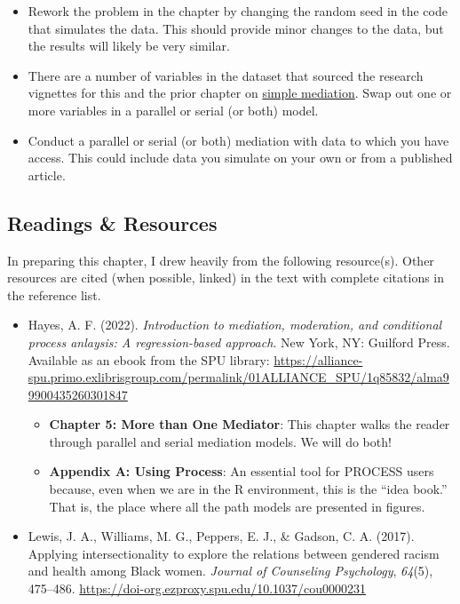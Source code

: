 \documentclass[
  11pt,
]{book}
\providecommand{\tightlist}{%
  \setlength{\itemsep}{0pt}\setlength{\parskip}{0pt}}
\begin{document}
\begin{itemize}
\tightlist
\item
  Rework the problem in the chapter by changing the random seed in the code that simulates the data. This should provide minor changes to the data, but the results will likely be very similar.
\item
  There are a number of variables in the dataset that sourced the research vignettes for this and the prior chapter on \protect\hyperlink{SimpleMed}{simple mediation}. Swap out one or more variables in a parallel or serial (or both) model.
\item
  Conduct a parallel or serial (or both) mediation with data to which you have access. This could include data you simulate on your own or from a published article.
\end{itemize}

\hypertarget{readings-resources-5}{%
\subsection{Readings \& Resources}\label{readings-resources-5}}

In preparing this chapter, I drew heavily from the following resource(s). Other resources are cited (when possible, linked) in the text with complete citations in the reference list.

\begin{itemize}
\tightlist
\item
  Hayes, A. F. (2022). \emph{Introduction to mediation, moderation, and conditional process anlaysis: A regression-based approach}. New York, NY: Guilford Press. Available as an ebook from the SPU library: \url{https://alliance-spu.primo.exlibrisgroup.com/permalink/01ALLIANCE_SPU/1q85832/alma99900435260301847}

  \begin{itemize}
  \tightlist
  \item
    \textbf{Chapter 5: More than One Mediator}: This chapter walks the reader through parallel and serial mediation models. We will do both!
  \item
    \textbf{Appendix A: Using Process}: An essential tool for PROCESS users because, even when we are in the R environment, this is the ``idea book.'' That is, the place where all the path models are presented in figures.
  \end{itemize}
\item
  Lewis, J. A., Williams, M. G., Peppers, E. J., \& Gadson, C. A. (2017). Applying intersectionality to explore the relations between gendered racism and health among Black women. \emph{Journal of Counseling Psychology}, \emph{64}(5), 475--486. \url{https://doi-org.ezproxy.spu.edu/10.1037/cou0000231}
\end{itemize}
\end{document}

